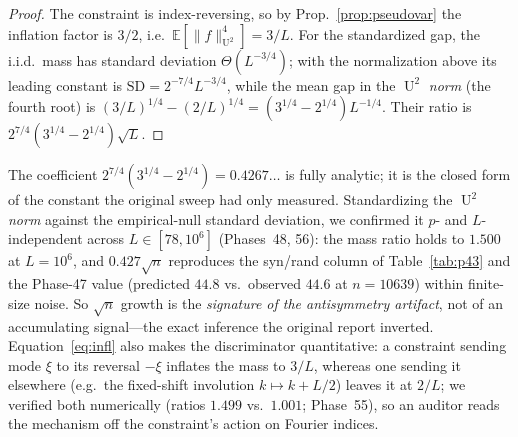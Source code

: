 \documentclass[11pt]{article}
\theoremstyle{definition}
\DeclareMathOperator{\Uk}{U}
\begin{document}
\begin{proof}
The constraint is index-reversing, so by Prop.~\ref{prop:pseudovar} the
inflation factor is $3/2$, i.e.\ $\mathbb E[\|f\|_{\Uk^2}^4]=3/L$. For the
standardized gap, the i.i.d.\ mass has standard deviation
$\Theta(L^{-3/4})$; with the normalization above its leading constant is
$\mathrm{SD}=2^{-7/4}L^{-3/4}$, while the mean gap in the $\Uk^2$
\emph{norm} (the fourth root) is
$(3/L)^{1/4}-(2/L)^{1/4}=(3^{1/4}-2^{1/4})L^{-1/4}$. Their ratio is
$2^{7/4}(3^{1/4}-2^{1/4})\sqrt L$.
\end{proof}

The coefficient $2^{7/4}(3^{1/4}-2^{1/4})=0.4267\ldots$ is fully analytic;
it is the closed form of the constant the original sweep had only
measured. Standardizing the $\Uk^2$ \emph{norm} against the
empirical-null standard deviation, we confirmed it $p$- and
$L$-independent across $L\in[78,10^6]$ (Phases~48, 56): the mass ratio
holds to $1.500$ at $L=10^6$, and $0.427\sqrt n$ reproduces the syn/rand
column of Table~\ref{tab:p43} and the Phase-47 value (predicted $44.8$
vs.\ observed $44.6$ at $n=10639$) within finite-size noise. So $\sqrt n$
growth is the \emph{signature of the antisymmetry artifact}, not of an
accumulating signal---the exact inference the original report inverted.
Equation~\eqref{eq:infl} also makes the discriminator quantitative: a
constraint sending mode $\xi$ to its reversal $-\xi$ inflates the mass to
$3/L$, whereas one sending it elsewhere (e.g.\ the fixed-shift involution
$k\mapsto k+L/2$) leaves it at $2/L$; we verified both numerically (ratios
$1.499$ vs.\ $1.001$; Phase~55), so an auditor reads the mechanism off the
constraint's action on Fourier indices.
\end{document}
